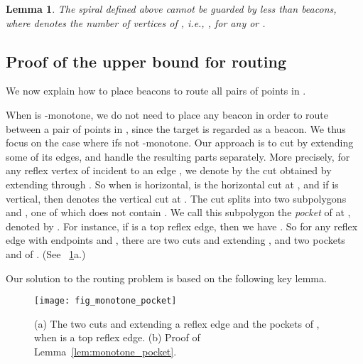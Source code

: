 \documentclass[11pt]{article}
\newtheorem{lemma}{Lemma}
\theoremstyle{definition}
\begin{document}
\begin{lemma} \label{lem:coverage_lower_bound}
 The spiral  defined above cannot be guarded by less than
  beacons,
 where  denotes the number of vertices of , i.e., , for any  or .
\end{lemma}


\subsection{Proof of the upper bound for routing}

We now explain how to place  beacons to route all pairs of points in .

When  is -monotone, we do not need to place any beacon in order to route between
a pair  of points in , since the target  is regarded as a beacon.
We thus focus on the case where  ifs not -monotone. 
Our approach is to cut  by extending some of its edges, and
handle the resulting parts separately. More precisely,
for any reflex vertex  of   incident to an edge ,
we denote by  the cut obtained by extending  through .
So when   is horizontal,  is the horizontal cut at , and
if  is vertical, then  denotes the vertical cut at .
The cut  splits  into two subpolygons  and ,
one of which does not contain .
We call this subpolygon the \emph{pocket} of  at , denoted by .
For instance, if  is a top reflex edge, then we have .
So for any reflex edge  with endpoints  and ,
there are two cuts  and  extending , 
and two pockets  and  of .
(See \figurename~\ref{fig:monotone_pocket}a.)

Our solution to the routing problem is based on the following key lemma.

\begin{figure}[tb]
\centering
\texttt{[image: fig\_monotone\_pocket]}
\caption{(a) The two cuts  and  extending a reflex edge 
and the pockets of , when  is a top reflex edge.
(b) Proof of Lemma~\ref{lem:monotone_pocket}.
\label{fig:monotone_pocket}}
\end{figure}
\end{document}
